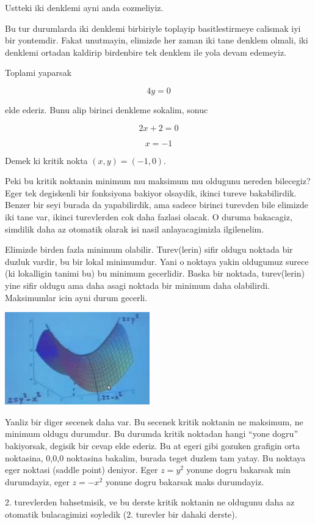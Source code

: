 \documentclass[12pt,fleqn]{article}
\begin{document}
Ustteki iki denklemi ayni anda cozmeliyiz. 

Bu tur durumlarda iki denklemi birbiriyle toplayip basitlestirmeye calismak
iyi bir yontemdir. Fakat unutmayin, elimizde her zaman iki tane denklem
olmali, iki denklemi ortadan kaldirip birdenbire tek denklem ile yola devam
edemeyiz. 

Toplami yaparsak

\[ 4y = 0 \]

elde ederiz. Bunu alip birinci denkleme sokalim, sonuc

\[ 2x + 2 = 0 \]

\[ x = -1 \]

Demek ki kritik nokta $(x,y) = (-1,0)$. 

Peki bu kritik noktanin minimum mu maksimum mu oldugunu nereden bilecegiz?
Eger tek degiskenli bir fonksiyona bakiyor olsaydik, ikinci tureve
bakabilirdik. Benzer bir seyi burada da yapabilirdik, ama sadece birinci
turevden bile elimizde iki tane var, ikinci turevlerden cok daha fazlasi
olacak. O duruma bakacagiz, simdilik daha az otomatik olarak isi nasil
anlayacagimizla ilgilenelim. 

Elimizde birden fazla minimum olabilir. Turev(lerin) sifir oldugu noktada
bir duzluk vardir, bu bir lokal minimumdur. Yani o noktaya yakin oldugumuz
surece (ki lokalligin tanimi bu) bu minimum gecerlidir. Baska bir noktada,
turev(lerin) yine sifir oldugu ama daha asagi noktada bir minimum daha
olabilirdi. Maksimumlar icin ayni durum gecerli.

\includegraphics[height=4cm]{9_4.png}

Yanliz bir diger secenek daha var. Bu secenek kritik noktanin ne maksimum,
ne minimum oldugu durumdur. Bu durumda kritik noktadan hangi ``yone dogru''
bakiyorsak, degisik bir cevap elde ederiz. Bu at egeri gibi gozuken
grafigin orta noktasina, 0,0,0 noktasina bakalim, burada teget duzlem tam
yatay. Bu noktaya eger noktasi (saddle point) deniyor. Eger $z=y^2$ yonune
dogru bakarsak min durumdayiz, eger $z=-x^2$ yonune dogru bakarsak maks
durumdayiz. 

2. turevlerden bahsetmisik, ve bu derste kritik noktanin ne oldugunu daha
az otomatik bulacagimizi soyledik (2. turevler bir dahaki derste). 
\end{document}
